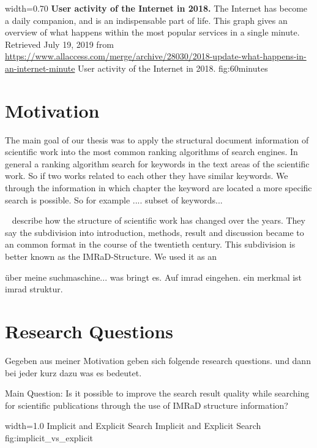       {width=0.70\textwidth}
      {\textbf{User activity of the Internet in 2018.} The Internet has become a daily companion, and is an indispensable part of life. This graph gives an overview of what happens within the most popular services in a single minute. Retrieved July 19, 2019 from \url{https://www.allaccess.com/merge/archive/28030/2018-update-what-happens-in-an-internet-minute}}
      {User activity of the Internet in 2018.}
      {fig:60minutes}

\section{Motivation}
\label{sec:Motivation}

The main goal of our thesis was to apply the structural document information of scientific work into the most common ranking algorithms of search engines. In general a ranking algorithm search for keywords in the text areas of the scientific work. So if two works related to each other they have similar keywords. We through the information in which chapter the keyword are located a more specific search is possible. So for example .... subset of keywords...



 ~\cite{Sollaci-The-2004} describe how the structure of scientific work has changed over the years. They say the subdivision into introduction, methods, result and discussion became to an common format in the course of the twentieth century. This subdivision is better known as the IMRaD-Structure. We used it as an



über meine suchmaschine... was bringt es. Auf imrad eingehen. ein merkmal ist imrad struktur.


\section{Research Questions}
\label{sec:research_questions}

Gegeben aus meiner Motivation geben sich folgende research questions. und dann bei jeder kurz dazu was es bedeutet.


Main Question: Is it possible to improve the search result quality while searching for scientific publications through the use of IMRaD structure information?

      {width=1.0\textwidth}
      {Implicit and Explicit Search}
      {Implicit and Explicit Search}
      {fig:implicit_vs_explicit}

